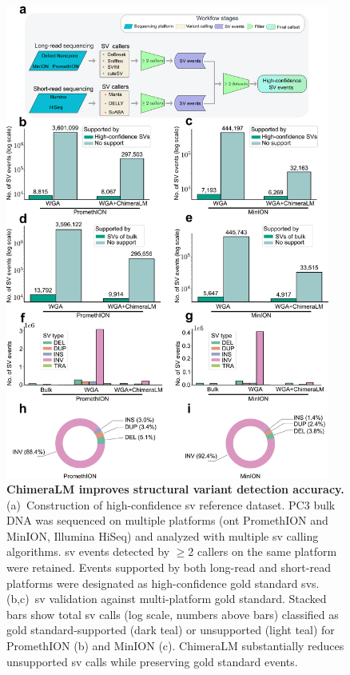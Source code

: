 \documentclass[pdflatex,sn-nature,lineno]{sn-jnl}%
\theoremstyle{thmstyleone}%
\theoremstyle{thmstyletwo}%
\theoremstyle{thmstylethree}%
\begin{document}
\begin{figure}[H]
	\begin{center}
		\includegraphics[width=0.95\textwidth]{final_figures/figure3}
	\end{center}
	\caption{{\bf ChimeraLM improves structural variant detection accuracy.}
		(a)~Construction of high-confidence \gls{sv} reference dataset. PC3 bulk DNA was sequenced on multiple platforms (\gls{ont} PromethION and MinION, Illumina HiSeq) and analyzed with multiple \gls{sv} calling algorithms. \gls{sv} events detected by $\geq$2 callers on the same platform were retained. Events supported by both long-read and short-read platforms were designated as high-confidence gold standard \glspl{sv}.
		(b,c)~\gls{sv} validation against multi-platform gold standard. Stacked bars show total \gls{sv} calls (log scale, numbers above bars) classified as gold standard-supported (dark teal) or unsupported (light teal) for PromethION (b) and MinION (c). ChimeraLM substantially reduces unsupported \gls{sv} calls while preserving gold standard events.
}
\end{figure}
\end{document}
